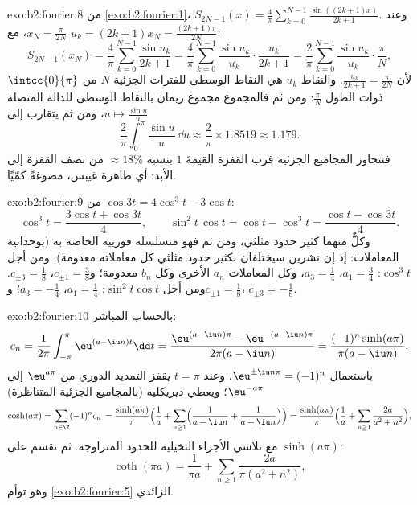 \begin{solution}{exo:b2:fourier:8}
من \cref{exo:b2:fourier:1}، $S_{2N-1}(x) =
\frac4\pi\sum_{k=0}^{N-1}\frac{\sin((2k+1)x)}{2k+1}$. وعند $x_N =
\frac{\pi}{2N}$، مع $u_k = (2k+1)x_N = \frac{(2k+1)\pi}{2N}$:
\[
S_{2N-1}(x_N) = \frac{4}{\pi}\sum_{k=0}^{N-1}\frac{\sin u_k}{2k+1}
= \frac{4}{\pi}\sum_{k=0}^{N-1}\frac{\sin u_k}{u_k}\cdot
\frac{u_k}{2k+1}
= \frac{2}{\pi}\sum_{k=0}^{N-1}\frac{\sin u_k}{u_k}\cdot
\frac{\pi}{N},
\]
لأن $\frac{u_k}{2k+1} = \frac{\pi}{2N}$. والنقاط $u_k$ هي
النقاط الوسطى للفترات الجزئية $N$ من $\intcc{0}{\pi}$ ذوات الطول
$\frac{\pi}{N}$: ومن ثم فالمجموع مجموع ريمان بالنقاط الوسطى للدالة
المتصلة $u \mapsto \frac{\sin u}{u}$، ومن ثم يتقارب إلى
\[
\frac{2}{\pi}\int_0^\pi \frac{\sin u}{u}\,\dd u
\approx \frac{2}{\pi}\times 1.8519 \approx 1.179 .
\]
فتتجاوز المجاميع الجزئية قرب القفزة القيمةَ $1$ بنسبة $\approx
18\%$ من نصف القفزة إلى الأبد: أي ظاهرة غيبس، مصوغةً كمّيًا.
\end{solution}

\begin{solution}{exo:b2:fourier:9}
من $\cos 3t = 4\cos^3t - 3\cos t$:
\[
\cos^3 t = \frac{3\cos t + \cos 3t}{4},
\qquad
\sin^2t\,\cos t = \cos t - \cos^3 t
= \frac{\cos t - \cos 3t}{4} .
\]
وكلٌّ منهما كثير حدود مثلثي، ومن ثم فهو متسلسلة فورييه
الخاصة به (بوحدانية المعاملات: إذ إن نشرين
سيختلفان بكثير حدود مثلثي كل
معاملاته معدومة). ومن أجل $\cos^3t$: $a_1 = \frac34$، $a_3 =
\frac14$، وكل المعاملات $a_n$ الأخرى وكل $b_n$ معدومة؛ و$c_{\pm1} =
\frac38$، $c_{\pm3} = \frac18$. ومن أجل $\sin^2t\cos t$: $a_1 =
\frac14$، $a_3 = -\frac14$؛ و$c_{\pm1} = \frac18$، $c_{\pm3} =
-\frac18$.
\end{solution}

\begin{solution}{exo:b2:fourier:10}
بالحساب المباشر:
\[
c_n = \frac{1}{2\pi}\int_{-\pi}^{\pi}\eu^{(a - \iu n)t}\dd t
= \frac{\eu^{(a-\iu n)\pi} - \eu^{-(a - \iu n)\pi}}
{2\pi(a - \iu n)}
= \frac{(-1)^n\sinh(a\pi)}{\pi(a - \iu n)} ,
\]
باستعمال $\eu^{\pm\iu n\pi} = (-1)^n$. وعند $t = \pi$ يقفز التمديد
الدوري من $\eu^{a\pi}$ إلى $\eu^{-a\pi}$؛ ويعطي ديريكليه
(بالمجاميع الجزئية المتناظرة)
\[
\cosh(a\pi) = \sum_{n\in\Z}(-1)^n c_n\,
= \frac{\sinh(a\pi)}{\pi}\Bigl(\frac1a +
\sum_{n\geq1}\Bigl(\frac{1}{a - \iu n} +
\frac{1}{a + \iu n}\Bigr)\Bigr)
= \frac{\sinh(a\pi)}{\pi}\Bigl(\frac1a +
\sum_{n\geq1}\frac{2a}{a^2 + n^2}\Bigr) ,
\]
مع تلاشي الأجزاء التخيلية للحدود المتزاوجة. ثم نقسم على
$\sinh(a\pi)$:
\[
\coth(\pi a) = \frac{1}{\pi a} +
\sum_{n\geq1}\frac{2a}{\pi(a^2 + n^2)} ,
\]
وهو توأم \cref{exo:b2:fourier:5} الزائدي.
\end{solution}

